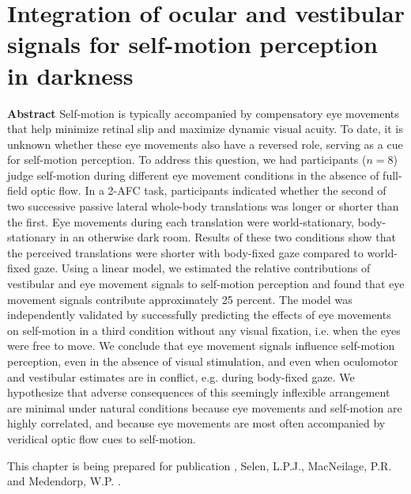 
\thispagestyle{empty}

\chapter{Integration of ocular and vestibular signals for self-motion perception in darkness}
\chaptermark{}

\newpage

\small {\bf Abstract} Self-motion is typically accompanied by compensatory eye movements that help minimize retinal slip and maximize dynamic visual acuity. To date, it is unknown whether these eye movements also have a reversed role, serving as a cue for self-motion perception. To address this question, we had participants ($n=8$) judge self-motion during different eye movement conditions in the absence of full-field optic flow.  In a 2-AFC task, participants indicated whether the second of two successive passive lateral whole-body translations was longer or shorter than the first. Eye movements during each translation were world-stationary, body-stationary in an otherwise dark room. Results of these two conditions show that the perceived translations were shorter with body-fixed gaze compared to world-fixed gaze. Using a linear model, we estimated the relative contributions of vestibular and eye movement signals to self-motion perception and found that eye movement signals contribute approximately 25 percent. The model was independently validated by successfully predicting the effects of eye movements on self-motion in a third condition without any visual fixation, i.e. when the eyes were free to move. We conclude that eye movement signals influence self-motion perception, even in the absence of visual stimulation, and even when oculomotor and vestibular estimates are in conflict, e.g. during body-fixed gaze. We hypothesize that adverse consequences of this seemingly inflexible arrangement are minimal under natural conditions because eye movements and self-motion are highly correlated, and because eye movements are most often accompanied by veridical optic flow cues to self-motion.

\vfill

\noindent\underline{ \hspace{4cm} }

\noindent This chapter is being prepared for publication \newline
{}, Selen, L.P.J., MacNeilage, P.R. and Medendorp, W.P. \citeyear{clemens2015a}. %

\newpage





